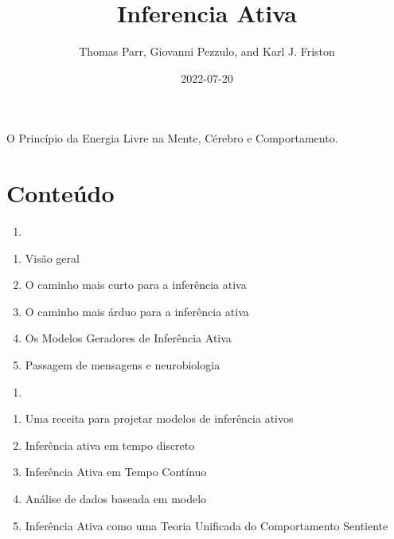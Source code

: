 \documentclass[
  12pt,
]{book}
\title{Inferencia Ativa}
\author{Thomas Parr, Giovanni Pezzulo, and Karl J. Friston}
\date{2022-07-20}
\providecommand{\tightlist}{%
  \setlength{\itemsep}{0pt}\setlength{\parskip}{0pt}}
\begin{document}
\maketitle

{
\hypersetup{linkcolor=}
\setcounter{tocdepth}{1}
\tableofcontents
}
\listoffigures
\listoftables
O Princípio da Energia Livre na Mente, Cérebro e Comportamento.

\hypertarget{conteuxfado}{%
\chapter*{Conteúdo}\label{conteuxfado}}

\begin{enumerate}
\def\labelenumi{(\Roman{enumi})}
\tightlist
\item
\end{enumerate}

\begin{enumerate}
\def\labelenumi{\arabic{enumi}.}
\tightlist
\item
  Visão geral\\
\item
  O caminho mais curto para a inferência ativa\\
\item
  O caminho mais árduo para a inferência ativa\\
\item
  Os Modelos Geradores de Inferência Ativa\\
\item
  Passagem de mensagens e neurobiologia
\end{enumerate}

\begin{enumerate}
\def\labelenumi{(\Roman{enumi})}
\setcounter{enumi}{1}
\tightlist
\item
\end{enumerate}

\begin{enumerate}
\def\labelenumi{\arabic{enumi}.}
\setcounter{enumi}{5}
\tightlist
\item
  Uma receita para projetar modelos de inferência ativos
\item
  Inferência ativa em tempo discreto
\item
  Inferência Ativa em Tempo Contínuo
\item
  Análise de dados baseada em modelo
\item
  Inferência Ativa como uma Teoria Unificada do Comportamento Sentiente
\end{enumerate}
\end{document}
